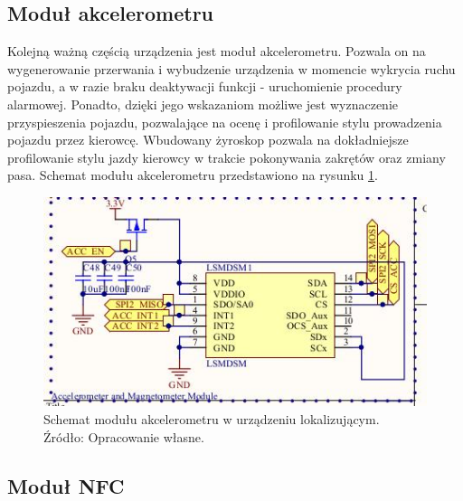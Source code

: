 \subsection{Moduł akcelerometru}

Kolejną ważną częścią urządzenia jest moduł akcelerometru. Pozwala on na wygenerowanie przerwania i wybudzenie urządzenia w momencie wykrycia ruchu pojazdu, a w razie braku deaktywacji funkcji - uruchomienie procedury alarmowej. Ponadto, dzięki jego wskazaniom możliwe jest wyznaczenie przyspieszenia pojazdu, pozwalające na ocenę i profilowanie stylu prowadzenia pojazdu przez kierowcę. Wbudowany żyroskop pozwala na dokładniejsze profilowanie stylu jazdy kierowcy w trakcie pokonywania zakrętów oraz zmiany pasa.
Schemat modułu akcelerometru przedstawiono na rysunku \ref{fig:image_mainboard_functional_accelerometer}.

\begin{figure}[H]
	\centering
	\includegraphics[width=15cm]{img/schematics/mainboard_functional_accelerometer.jpg}
	\caption{Schemat modułu akcelerometru w urządzeniu lokalizującym. \\ Źródło: Opracowanie własne.}
	\label{fig:image_mainboard_functional_accelerometer}
\end{figure}

\subsection{Moduł NFC}

